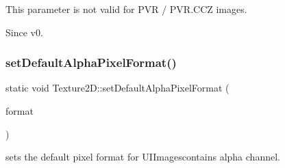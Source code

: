 This parameter is not valid for P\+VR / P\+V\+R.\+C\+CZ images.

\begin{DoxySince}{Since}
v0. 
\end{DoxySince}
\mbox{\label{classTexture2D_ae384caf70dece31466fa989f2640a33a}} 
\subsubsection{\texorpdfstring{set\+Default\+Alpha\+Pixel\+Format()}{setDefaultAlphaPixelFormat()}\hspace{0.1cm}{\footnotesize\ttfamily [2/2]}}
{\footnotesize\ttfamily static void Texture2\+D\+::set\+Default\+Alpha\+Pixel\+Format (\begin{DoxyParamCaption}\item[{\hyperlink{classTexture2D_a45d9d8bb5a0669def36bbdfbfb91d220}{Texture2\+D\+::\+Pixel\+Format}}]{format }\end{DoxyParamCaption})\hspace{0.3cm}{\ttfamily [static]}}

sets the default pixel format for U\+I\+Imagescontains alpha channel.


